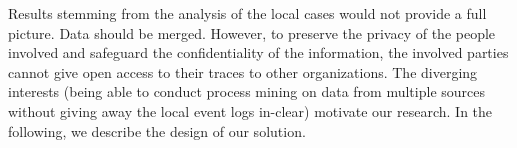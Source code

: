 Results stemming from the analysis of the local cases would not provide a full picture. Data should be merged. However, to preserve the privacy of the people involved and safeguard the confidentiality of the information, the involved parties cannot give open access to their traces to other organizations. The diverging interests (being able to conduct process mining on data from multiple sources without giving away the local event logs in-clear) motivate our research. In the following, we describe the design of our solution.